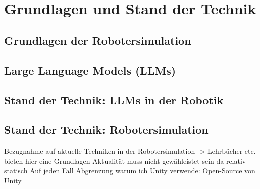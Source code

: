 \chapter{Grundlagen und Stand der Technik}
\label{cap:Grundlagen}

\section{Grundlagen der Robotersimulation}
\label{sec:Grundlagen_Robotersimulation}

\section{Large Language Models (LLMs)}
\label{sec:Grundlagen_LLMs}
\section{Stand der Technik: LLMs in der Robotik}
\label{sec:Stand_LLMs_Robotik}
\section{Stand der Technik: Robotersimulation}
\label{sec:Stand_Robotersimulation}
Bezugnahme auf aktuelle Techniken in der Robotersimulation -> Lehrbücher etc. bieten hier eine Grundlagen
Aktualität muss nicht gewähleistet sein da relativ statisch
Auf jeden Fall Abgrenzung warum ich Unity verwende: Open-Source von Unity
